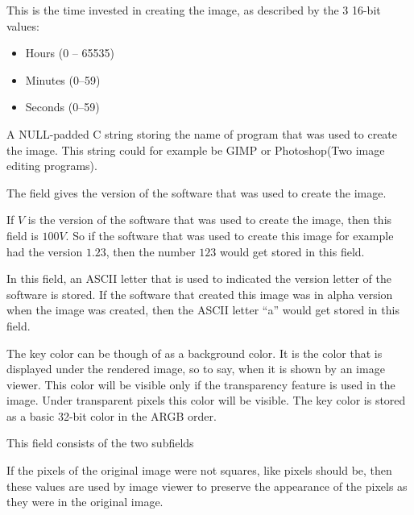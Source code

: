 This is the time invested in creating the image, as described by the 3
16-bit values:

\begin{itemize}
\item Hours (0 -- 65535)
\item Minutes (0--59)
\item Seconds (0--59)
\end{itemize}


A NULL-padded C string storing the name of program that was used to
create the image. This string could for example be GIMP or
Photoshop(Two image editing programs).


The field gives the version of the software that was used to create
the image.


If $V$ is the version of the software that was used to create the
image, then this field is $100V$. So if the software that was
used to create this image for example had the version $1.23$, then the
number $123$ would get stored in this field.


In this field, an ASCII letter that is used to indicated the version
letter of the software is stored. If the software that created this
image was in alpha version when the image was created, then the ASCII
letter ``a'' would get stored in this field.


The key color can be though of as a background color. It is the color
that is displayed under the rendered image, so to say, when it is
shown by an image viewer. This color will be visible only if the
transparency feature is used in the image. Under transparent pixels
this color will be visible. The key color is stored as a basic 32-bit
color in the ARGB order.


This field consists of the two subfields


If the pixels of the original image were not squares, like pixels
should be, then these values are used by image viewer to preserve the
appearance of the pixels as they were in the original image.

